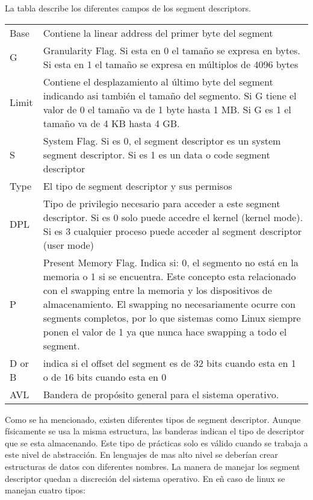 La tabla {} describe los diferentes campos de los segment descriptors.
\begin{tabular}{ll} Base & Contiene la linear address del primer byte del
segment\\ G & Granularity Flag. Si esta en 0 el tamaño se expresa en bytes. Si
esta en 1 el tamaño se expresa en múltiplos de 4096 bytes\\ Limit & Contiene el
desplazamiento al último byte del segment indicando asi también el tamaño del
segmento. Si G tiene el valor de 0 el tamaño va de 1 byte hasta 1 MB. Si G es 1
el tamaño va de 4 KB hasta 4 GB. \\ S & System Flag. Si es 0, el segment
descriptor es un system segment descriptor. Si es 1 es un data o code segment
descriptor\\ Type & El tipo de segment descriptor y sus permisos\\ DPL & Tipo
de privilegio necesario para acceder a este segment descriptor. Si es 0 solo
puede accedre el kernel (kernel mode). Si es 3 cualquier proceso puede acceder
al segment descriptor (user mode)\\ P & Present Memory Flag. Indica si: 0, el
segmento no está en la memoria o 1 si se encuentra. Este concepto esta
relacionado con el swapping entre la memoria y los dispositivos de
almacenamiento. El swapping no necesariamente ocurre con segments completos,
por lo que sistemas como Linux siempre ponen el valor de 1 ya que nunca hace
swapping a todo el segment. \\ D or B & indica si el offset del segment es de
32 bits cuando esta en 1 o de 16 bits cuando esta en 0 \\ AVL & Bandera de
propósito general para el sistema operativo. \end{tabular}

Como se ha mencionado, existen diferentes tipos de segment descriptor. Aunque
físicamente se usa la misma estructura, las banderas indican el tipo de
descriptor que se esta almacenando. Este tipo de prácticas solo es válido
cuando se trabaja a este nivel de abstracción. En lenguajes de mas alto nivel
se deberían crear estructuras de datos con diferentes nombres. La manera de
manejar los segment descriptor quedan a discreción del sistema operativo. En eñ
caso de linux se manejan cuatro tipos:

